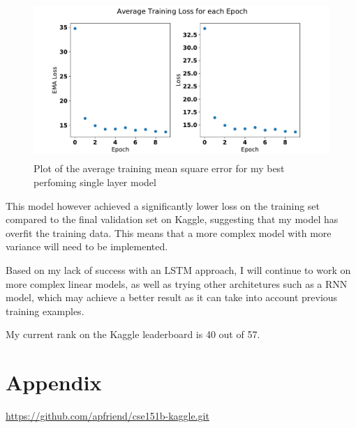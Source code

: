 \documentclass{article}
\begin{document}
      \begin{figure}[H]
          \centering
          \includegraphics[height=6cm]{figures/train-loss/2021.05.24-multi-linear-ema075-epoch10-batchsz128-epoch-avg.pdf}%
          \caption{Plot of the average training mean square error for my best perfoming single layer model}%
          \label{fig:5}
      \end{figure}
      
      This model however achieved a significantly lower loss on the training set compared to the final validation set on Kaggle,
      suggesting that my model has overfit the training data. This means that a more complex model with more variance will need to be implemented.
      
      Based on my lack of success with an LSTM approach, I will continue to work on more complex linear models, as well as trying other architetures
      such as a RNN model, which may achieve a better result as it can take into account previous training examples.
      
      My current rank on the Kaggle leaderboard is 40 out of 57.

  \appendix

  \section{Appendix}

  \url{https://github.com/apfriend/cse151b-kaggle.git}

        
\end{document}
